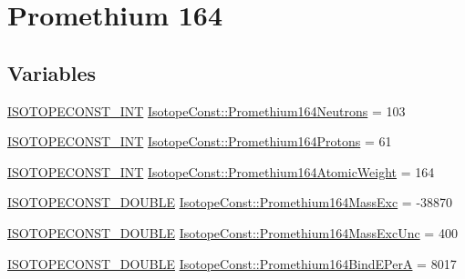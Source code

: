 \hypertarget{group___isotope_const-_promethium-_pm164}{}\section{Promethium 164}
\label{group___isotope_const-_promethium-_pm164}
\subsection*{Variables}
\begin{DoxyCompactItemize}
\item 
\mbox{\hyperlink{group___isotope_const-_macros_ga5f18360b3e99483a35c32d789e62621c}{I\+S\+O\+T\+O\+P\+E\+C\+O\+N\+S\+T\+\_\+\+I\+NT}} \mbox{\hyperlink{group___isotope_const-_promethium-_pm164_gaf9b605806138ab0fc3258b92ed2b5118}{Isotope\+Const\+::\+Promethium164\+Neutrons}} = 103
\item 
\mbox{\hyperlink{group___isotope_const-_macros_ga5f18360b3e99483a35c32d789e62621c}{I\+S\+O\+T\+O\+P\+E\+C\+O\+N\+S\+T\+\_\+\+I\+NT}} \mbox{\hyperlink{group___isotope_const-_promethium-_pm164_ga37ee0f0ed4d51c6d7a18516446dd5798}{Isotope\+Const\+::\+Promethium164\+Protons}} = 61
\item 
\mbox{\hyperlink{group___isotope_const-_macros_ga5f18360b3e99483a35c32d789e62621c}{I\+S\+O\+T\+O\+P\+E\+C\+O\+N\+S\+T\+\_\+\+I\+NT}} \mbox{\hyperlink{group___isotope_const-_promethium-_pm164_gab2016691bce3f3d8f3602505b1bff2e6}{Isotope\+Const\+::\+Promethium164\+Atomic\+Weight}} = 164
\item 
\mbox{\hyperlink{group___isotope_const-_macros_ga8f45a7272ce02c0b4c65c44636ed719a}{I\+S\+O\+T\+O\+P\+E\+C\+O\+N\+S\+T\+\_\+\+D\+O\+U\+B\+LE}} \mbox{\hyperlink{group___isotope_const-_promethium-_pm164_ga3ad22895327cb400a576b1492fc6c87c}{Isotope\+Const\+::\+Promethium164\+Mass\+Exc}} = -\/38870
\item 
\mbox{\hyperlink{group___isotope_const-_macros_ga8f45a7272ce02c0b4c65c44636ed719a}{I\+S\+O\+T\+O\+P\+E\+C\+O\+N\+S\+T\+\_\+\+D\+O\+U\+B\+LE}} \mbox{\hyperlink{group___isotope_const-_promethium-_pm164_gafc814a39d4dd646e79fb86e1a38d91ef}{Isotope\+Const\+::\+Promethium164\+Mass\+Exc\+Unc}} = 400
\item 
\mbox{\hyperlink{group___isotope_const-_macros_ga8f45a7272ce02c0b4c65c44636ed719a}{I\+S\+O\+T\+O\+P\+E\+C\+O\+N\+S\+T\+\_\+\+D\+O\+U\+B\+LE}} \mbox{\hyperlink{group___isotope_const-_promethium-_pm164_ga9d858cb5214df1c45ba7d78837822be0}{Isotope\+Const\+::\+Promethium164\+Bind\+E\+PerA}} = 8017
\item 

\end{DoxyCompactItemize}
